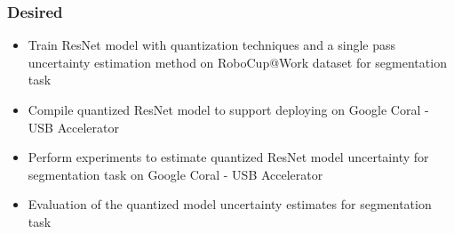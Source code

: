 \documentclass[rnd]{mas_proposal}
\begin{document}
\subsubsection*{Desired}
\begin{itemize}
    \item Train ResNet model with quantization techniques and a single pass uncertainty estimation method on RoboCup@Work dataset for segmentation task
    \item Compile quantized ResNet model to support deploying on Google Coral - USB Accelerator
    \item Perform experiments to estimate quantized ResNet model uncertainty for segmentation task on Google Coral - USB Accelerator
    \item Evaluation of the quantized model uncertainty estimates for segmentation task
\end{itemize}

\newpage
 

\end{document}
